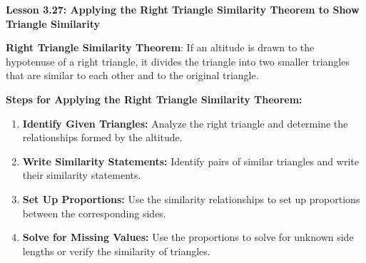 \begin{center}
\textbf{Lesson 3.27: Applying the Right Triangle Similarity Theorem to Show Triangle Similarity}
\end{center}

\vspace*{-1.5ex}

\noindent\textbf{Right Triangle Similarity Theorem}:
    If an altitude is drawn to the hypotenuse of a right triangle, it divides the triangle into two smaller triangles that are similar to each other and to the original triangle.


\noindent \textbf{Steps for Applying the Right Triangle Similarity Theorem:}
\begin{enumerate}
    \item \textbf{Identify Given Triangles:} Analyze the right triangle and determine the relationships formed by the altitude.
    \item \textbf{Write Similarity Statements:} Identify pairs of similar triangles and write their similarity statements.
    \item \textbf{Set Up Proportions:} Use the similarity relationships to set up proportions between the corresponding sides.
    \item \textbf{Solve for Missing Values:} Use the proportions to solve for unknown side lengths or verify the similarity of triangles.
\end{enumerate}
